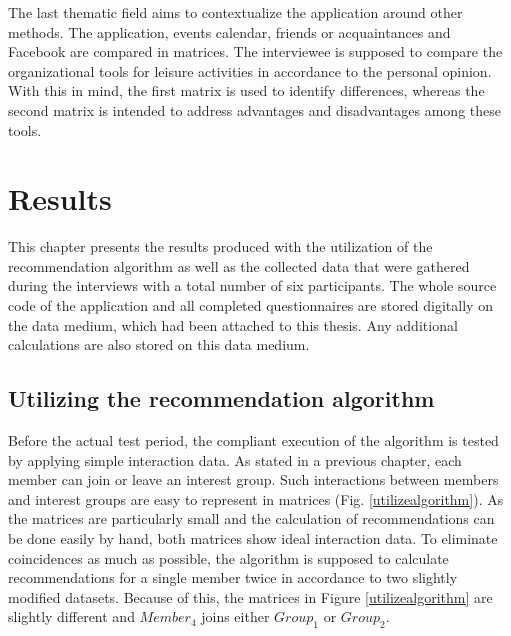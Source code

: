 \documentclass[12pt,numbers=noenddot,parskip,bibliography=totocnumbered,listof=totocnumbered,draft]{scrreprt}
\begin{document}
The last thematic field aims to contextualize the application around other methods. The application, events calendar, friends or acquaintances and Facebook are compared in matrices. The interviewee is supposed to compare the organizational tools for leisure activities in accordance to the personal opinion. With this in mind, the first matrix is used to identify differences, whereas the second matrix is intended to address advantages and disadvantages among these tools.

\chapter{Results}
This chapter presents the results produced with the utilization of the recommendation algorithm as well as the collected data that were gathered during the interviews with a total number of six participants. The whole source code of the application and all completed questionnaires are stored digitally on the data medium, which had been attached to this thesis. Any additional calculations are also stored on this data medium.

\section{Utilizing the recommendation algorithm}
Before the actual test period, the compliant execution of the algorithm is tested by applying simple interaction data. As stated in a previous chapter, each member can join or leave an interest group. Such interactions between members and interest groups are easy to represent in matrices (Fig. \ref{utilizealgorithm}). As the matrices are particularly small and the calculation of recommendations can be done easily by hand, both matrices show ideal interaction data. To eliminate coincidences as much as possible, the algorithm is supposed to calculate recommendations for a single member twice in accordance to two slightly modified datasets. Because of this, the matrices in Figure \ref{utilizealgorithm} are slightly different and $\mathit{Member}_4$ joins either $\mathit{Group}_1$ or $\mathit{Group}_2$.
\end{document}
